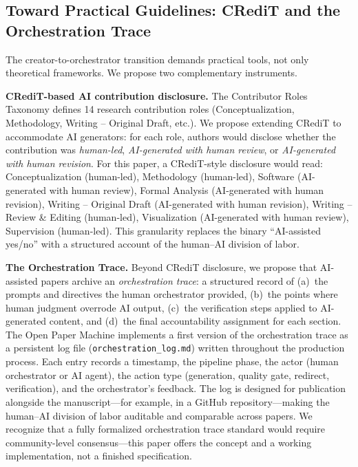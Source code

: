 \documentclass{article}
\begin{document}
\subsection{Toward Practical Guidelines: CRediT and the Orchestration Trace}

The creator-to-orchestrator transition demands practical tools, not only theoretical frameworks. We propose two complementary instruments.

\textbf{CRediT-based AI contribution disclosure.} The Contributor Roles Taxonomy \citep{brand2015credit} defines 14 research contribution roles (Conceptualization, Methodology, Writing -- Original Draft, etc.). We propose extending CRediT to accommodate AI generators: for each role, authors would disclose whether the contribution was \textit{human-led}, \textit{AI-generated with human review}, or \textit{AI-generated with human revision}. For this paper, a CRediT-style disclosure would read: Conceptualization (human-led), Methodology (human-led), Software (AI-generated with human review), Formal Analysis (AI-generated with human revision), Writing -- Original Draft (AI-generated with human revision), Writing -- Review \& Editing (human-led), Visualization (AI-generated with human review), Supervision (human-led). This granularity replaces the binary ``AI-assisted yes/no'' with a structured account of the human--AI division of labor.

\textbf{The Orchestration Trace.} Beyond CRediT disclosure, we propose that AI-assisted papers archive an \textit{orchestration trace}: a structured record of (a)~the prompts and directives the human orchestrator provided, (b)~the points where human judgment overrode AI output, (c)~the verification steps applied to AI-generated content, and (d)~the final accountability assignment for each section. The Open Paper Machine implements a first version of the orchestration trace as a persistent log file (\texttt{orchestration\_log.md}) written throughout the production process. Each entry records a timestamp, the pipeline phase, the actor (human orchestrator or AI agent), the action type (generation, quality gate, redirect, verification), and the orchestrator's feedback. The log is designed for publication alongside the manuscript---for example, in a GitHub repository---making the human--AI division of labor auditable and comparable across papers. We recognize that a fully formalized orchestration trace standard would require community-level consensus---this paper offers the concept and a working implementation, not a finished specification.
\end{document}
